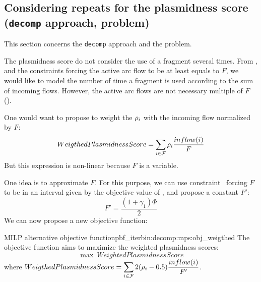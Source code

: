 \subsection{Considering repeats for the plasmidness score (\texttt{decomp} approach, \MGC{} problem)}

This section concerns the \texttt{decomp} approach and the \MGC{} problem.

The plasmidness score do not consider the use of a fragment several times.
From , and the constraints forcing the active arc flow to be at least equals to \(F\), we would like to model the number of time a fragment is used according to the sum of incoming flows.
However, the active arc flows are not necessary multiple of \(F\) ().

One would want to propose to weight the \(\rho_{i}\) with the incoming flow normalized by \(F\):
\[
  WeigthedPlasmidnessScore = \sum_{i \in \mathcal{F}{}} \rho_{i} \frac{inflow(i)}{F}
\]
But this expression is non-linear because \(F\) is a variable.

One idea is to approximate \(F\).
For this purpose, we can use constraint~ forcing \(F\) to be in an interval given by the objective value of \MCF{}, and propose a constant \(F'\):
\[
  F' = \frac{ (1 + \gamma_1) \Phi }{2}
\]
We can now propose a new objective function:

\begin{definition}{\MPS{} MILP alternative objective function}{pbf_iterbin:decomp:mps:obj_weigthed}
  The objective function aims to maximize the weighted plasmidness scores:
  \begin{equation}
    \max ~ WeightedPlasmidnessScore
    \label{mps:obj:max_weighted_plasmidness_score} %
  \end{equation}
  where \(\displaystyle WeigthedPlasmidnessScore = \sum_{i \in \mathcal{F}{}} 2 (\rho_{i} - 0.5) \frac{inflow(i)}{F'} \).
\end{definition}
